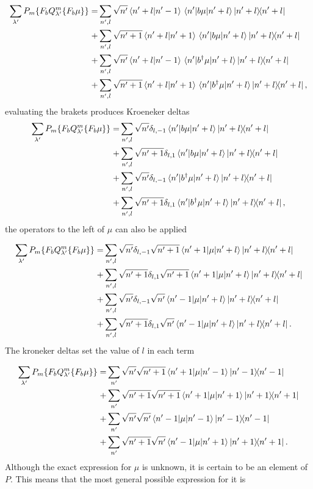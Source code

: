 \documentclass[12pt]{article}
\begin{document}
\begin{align*}
    \sum_{\lambda'}  P_m\{F_b Q^m_{\lambda'}\{F_b\mu\}\}=&\sum_{n',l} \sqrt{n'}\braket{n'+l}{n'-1}\mel{n'}{b\mu}{n'+l}\ketbra{n'+l}{n'+l}\\
    +&\sum_{n',l} \sqrt{n'+1}\braket{n'+l}{n'+1}\mel{n'}{b\mu}{n'+l}\ketbra{n'+l}{n'+l}\\
    +&\sum_{n',l} \sqrt{n'}\braket{n'+l}{n'-1}\mel{n'}{b^\dagger\mu}{n'+l}\ketbra{n'+l}{n'+l}\\
    +&\sum_{n',l} \sqrt{n'+1}\braket{n'+l}{n'+1}\mel{n'}{b^\dagger\mu}{n'+l}\ketbra{n'+l}{n'+l},
\end{align*} evaluating the brakets produces Kroeneker deltas
\begin{align*}
    \sum_{\lambda'}  P_m\{F_b Q^m_{\lambda'}\{F_b\mu\}\}=&\sum_{n',l} \sqrt{n'}\delta_{l,-1}\mel{n'}{b\mu}{n'+l}\ketbra{n'+l}{n'+l}\\
    +&\sum_{n',l} \sqrt{n'+1}\delta_{l,1}\mel{n'}{b\mu}{n'+l}\ketbra{n'+l}{n'+l}\\
    +&\sum_{n',l} \sqrt{n'}\delta_{l,-1}\mel{n'}{b^\dagger\mu}{n'+l}\ketbra{n'+l}{n'+l}\\
    +&\sum_{n',l} \sqrt{n'+1}\delta_{l,1}\mel{n'}{b^\dagger\mu}{n'+l}\ketbra{n'+l}{n'+l},
\end{align*} the operators to the left of $\mu$ can also be applied

\begin{align*}
    \sum_{\lambda'}  P_m\{F_b Q^m_{\lambda'}\{F_b\mu\}\}=&\sum_{n',l} \sqrt{n'}\delta_{l,-1}\sqrt{n'+1}\mel{n'+1}{\mu}{n'+l}\ketbra{n'+l}{n'+l}\\
    +&\sum_{n',l} \sqrt{n'+1}\delta_{l,1}\sqrt{n'+1}\mel{n'+1}{\mu}{n'+l}\ketbra{n'+l}{n'+l}\\
    +&\sum_{n',l} \sqrt{n'}\delta_{l,-1}\sqrt{n'}\mel{n'-1}{\mu}{n'+l}\ketbra{n'+l}{n'+l}\\
    +&\sum_{n',l} \sqrt{n'+1}\delta_{l,1}\sqrt{n'}\mel{n'-1}{\mu}{n'+l}\ketbra{n'+l}{n'+l}.
\end{align*} The kroneker deltas set the value of $l$ in each term

\begin{align*}
    \sum_{\lambda'}  P_m\{F_b Q^m_{\lambda'}\{F_b\mu\}\}=&\sum_{n'} \sqrt{n'}\sqrt{n'+1}\mel{n'+1}{\mu}{n'-1}\ketbra{n'-1}{n'-1}\\
    +&\sum_{n'} \sqrt{n'+1}\sqrt{n'+1}\mel{n'+1}{\mu}{n'+1}\ketbra{n'+1}{n'+1}\\
    +&\sum_{n'} \sqrt{n'}\sqrt{n'}\mel{n'-1}{\mu}{n'-1}\ketbra{n'-1}{n'-1}\\
    +&\sum_{n'} \sqrt{n'+1}\sqrt{n'}\mel{n'-1}{\mu}{n'+1}\ketbra{n'+1}{n'+1}.
\end{align*} Although the exact expression for $\mu$ is unknown, it is certain to be an element of $P$. This means that the most general possible expression for it is
\end{document}
